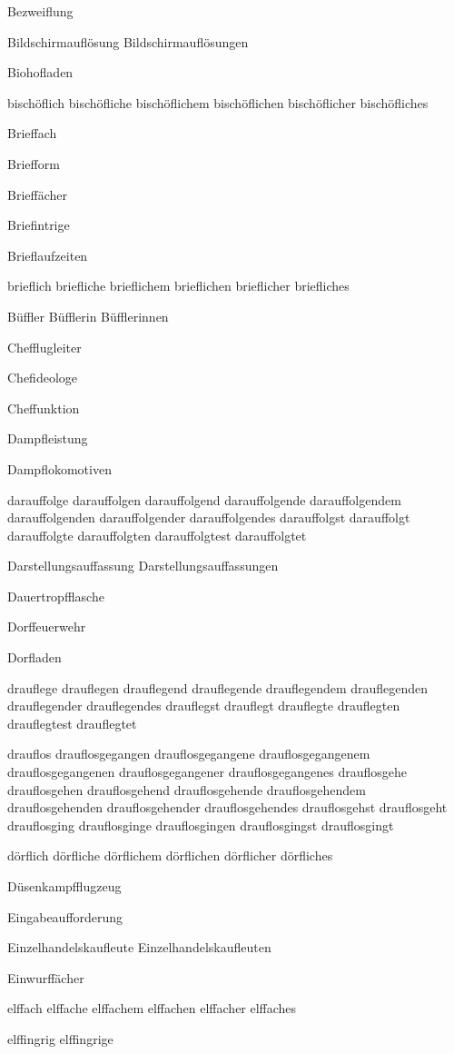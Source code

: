 Bezweiflung

Bildschirmauflösung Bildschirmauflösungen

Biohofladen

bischöflich bischöfliche bischöflichem bischöflichen bischöflicher bischöfliches

Brieffach

Briefform

Brieffächer

Briefintrige

Brieflaufzeiten

brieflich briefliche brieflichem brieflichen brieflicher briefliches

Büffler Büfflerin Büfflerinnen

Chefflugleiter

Chefideologe

Cheffunktion

Dampfleistung

Dampflokomotiven

darauffolge darauffolgen darauffolgend darauffolgende darauffolgendem darauffolgenden darauffolgender darauffolgendes darauffolgst darauffolgt darauffolgte darauffolgten darauffolgtest darauffolgtet

Darstellungsauffassung Darstellungsauffassungen

Dauertropfflasche

Dorffeuerwehr

Dorfladen

drauflege drauflegen drauflegend drauflegende drauflegendem drauflegenden drauflegender drauflegendes drauflegst drauflegt drauflegte drauflegten drauflegtest drauflegtet

drauflos drauflosgegangen drauflosgegangene drauflosgegangenem drauflosgegangenen drauflosgegangener drauflosgegangenes drauflosgehe drauflosgehen drauflosgehend drauflosgehende drauflosgehendem drauflosgehenden drauflosgehender drauflosgehendes drauflosgehst drauflosgeht drauflosging drauflosginge drauflosgingen drauflosgingst drauflosgingt

dörflich dörfliche dörflichem dörflichen dörflicher dörfliches

Düsenkampfflugzeug

Eingabeaufforderung

Einzelhandelskaufleute Einzelhandelskaufleuten

Einwurffächer

elffach elffache elffachem elffachen elffacher elffaches

elffingrig elffingrige

